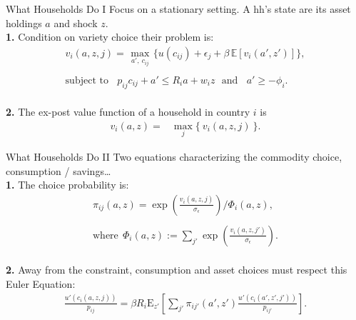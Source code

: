 \documentclass[9pt,pdftex,aspectratio=1610]{beamer}
\theoremstyle{definition}
\begin{document}
\begin{frame}[t]{What Households Do I}
\smallskip
Focus on a stationary setting. A hh's state are its asset holdings $a$ and shock $z$.\\
\bigskip
\textbf{1.} Condition on variety choice their problem is:
\begin{align}
v_{i}(a, z, j) =   \max_{\ a', \ c_{ij}  \ }\bigg  \{ u(c_{ij}) + \epsilon_{j}  + \beta \, \mathbb{E} [v_{i}(a', z')]  \bigg\}, \nonumber \\
\nonumber \\
\mbox{subject to}  \ \ \  \  p_{ij}c_{ij} +  a' \leq    R_{i} a + w_{i} z \ \ \  \mbox{and} \ \ \ \ a' \geq - \phi_{i}. \nonumber
\end{align}\\
\bigskip
\medskip
\textbf{2.} The ex-post value function of a household in country $i$ is
\begin{align}
v_{i}(a, z) = &  \max_{j} \big  \{ \  v_{i}(a, z, j)  \ \big \}. \nonumber
\end{align}
\end{frame}


\begin{frame}[t]{What Households Do II}
\smallskip
Two equations characterizing the commodity choice, consumption / savings\ldots\\
\medskip
\textbf{1.} The choice probability is:
\begin{align*}
\pi_{ij}(a, z) = \exp \left( \frac{ v_{i}(a, z, j) }{\sigma_{\epsilon}} \right) \Bigg / \Phi_{i}(a,z) ,\\
\\
\mbox{where} \ \ \Phi_{i}(a,z) := \sum_{j'} \exp \left( \frac{ v_{i}(a, z, j') }{\sigma_{\epsilon}}  \right).
\end{align*}\\
\bigskip
\medskip
\textbf{2.} Away from the constraint, consumption and asset choices must respect this Euler Equation:
\begin{align*}
\frac{u'(c_{i}(a, z, j))}{p_{ij}} = \beta R_{i} \mathrm{E}_{z'} \left[ \sum_{j'} \pi_{ij'}(a', z') \frac{u'(c_{i}(a', z', j'))}{p_{ij'}} \right].
\end{align*}
\end{frame}
\end{document}
